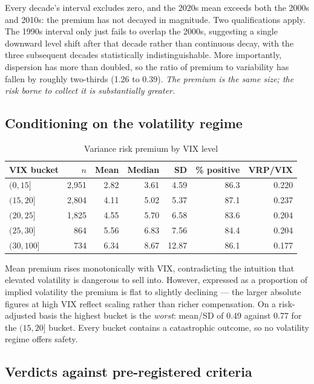 \documentclass[11pt,a4paper]{article}
\begin{document}
Every decade's interval excludes zero, and the 2020s mean exceeds both the 2000s and 2010s: the premium
has not decayed in magnitude. Two qualifications apply. The 1990s interval only just fails to overlap
the 2000s, suggesting a single downward level shift after that decade rather than continuous decay,
with the three subsequent decades statistically indistinguishable. More importantly, dispersion has
more than doubled, so the ratio of premium to variability has fallen by roughly two-thirds (1.26 to
0.39). \emph{The premium is the same size; the risk borne to collect it is substantially greater.}

\subsection{Conditioning on the volatility regime}

\begin{table}[h]
\centering
\caption{Variance risk premium by VIX level}
\begin{tabular}{@{}lrrrrrr@{}}
\toprule
VIX bucket & $n$ & Mean & Median & SD & \% positive & VRP/VIX \\
\midrule
$(0, 15]$ & 2,951 & 2.82 & 3.61 & 4.59 & 86.3 & 0.220 \\
$(15, 20]$ & 2,804 & 4.11 & 5.02 & 5.37 & 87.1 & 0.237 \\
$(20, 25]$ & 1,825 & 4.55 & 5.70 & 6.58 & 83.6 & 0.204 \\
$(25, 30]$ & 864 & 5.56 & 6.83 & 7.56 & 84.4 & 0.204 \\
$(30, 100]$ & 734 & 6.34 & 8.67 & 12.87 & 86.1 & 0.177 \\
\bottomrule
\end{tabular}
\end{table}

Mean premium rises monotonically with VIX, contradicting the intuition that elevated volatility is
dangerous to sell into. However, expressed as a proportion of implied volatility the premium is flat
to slightly declining --- the larger absolute figures at high VIX reflect scaling rather than richer
compensation. On a risk-adjusted basis the highest bucket is the \emph{worst}: mean/SD of 0.49 against
0.77 for the $(15,20]$ bucket. Every bucket contains a catastrophic outcome, so no volatility regime
offers safety.

\subsection{Verdicts against pre-registered criteria}
\end{document}
